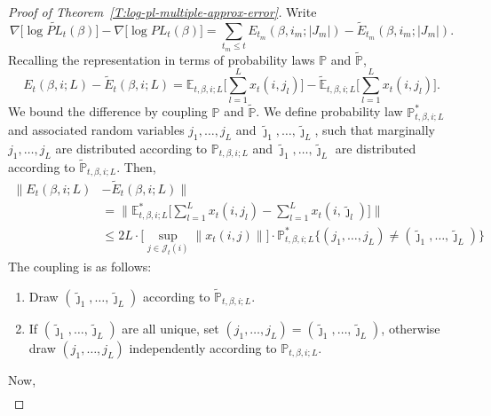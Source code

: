 \documentclass[aoas,preprint]{imsart}
\begin{document}
\begin{proof}[Proof of Theorem~\ref{T:log-pl-multiple-approx-error}]
Write
\[
    \nabla \big[ \log \widetilde{\mathit{PL}}_t(\beta) \big]
    -
    \nabla \big[ \log \mathit{PL}_t(\beta )\big]
        =
        \sum_{t_m \leq t}
            E_{t_m}\!(\beta, i_m; |J_m|)
            -
            \widetilde{E}_{t_m}\!(\beta, i_m; |J_m|).
\]
Recalling the representation in terms of probability laws $\mathbb{P}$ and
$\tilde{\mathbb{P}}$,
\[
    E_{t}(\beta, i; L) - \widetilde{E}_t(\beta, i; L)
        =
        \mathbb{E}_{t,\beta,i;L}
            \Big[ \sum_{l=1}^L x_t(i,j_l) \Big]
        -
        \widetilde{\mathbb{E}}_{t,\beta,i;L}
            \Big[ \sum_{l=1}^L x_t(i,j_l) \Big].
\]
We bound the difference by coupling $\mathbb{P}$ and $\widetilde{\mathbb{P}}$.
We define probability law $\mathbb{P}^\ast_{t,\beta,i;L}$ and associated
random variables $j_1, \ldots, j_L$ and
$\tilde \jmath_1, \ldots, \tilde \jmath_L$, such that marginally
$j_1, \ldots, j_L$ are distributed according to $\mathbb{P}_{t,\beta,i;L}$
and $\tilde \jmath_1, \ldots, \tilde \jmath_L$ are distributed according
to $\tilde{\mathbb{P}}_{t,\beta,i;L}$.  Then,
\begin{align*}
    \Big\| E_{t}(\beta, i; L) &- \widetilde{E}_t(\beta, i; L) \Big\| \\
        &=
            \Big\|
            \mathbb{E}_{t,\beta,i;L}^\ast
            \Big[
                \sum_{l=1}^L x_t(i,j_l)
                -
                \sum_{l=1}^L x_t(i, \tilde \jmath_l)
            \Big] 
            \Big\| \\
        &\leq
            2 L
            \cdot
            \Big[
                \sup_{j \in \mathcal{J}_t(i)}
                \| x_t(i,j) \|
            \Big]
            \cdot
            \mathbb{P}^\ast_{t,\beta,i;L}
            \Big\{
                (j_1, \ldots, j_L)
                    \neq
                    (\tilde \jmath_1, \ldots, \tilde \jmath_L)
            \Big\}
\end{align*}
The coupling is as follows:
\begin{enumerate}
    \item Draw $(\tilde \jmath_1, \ldots, \tilde \jmath_L)$ according to
        $\tilde{\mathbb{P}}_{t,\beta,i;L}$.
    \item If $(\tilde \jmath_1, \ldots, \tilde \jmath_L)$ are all unique,
        set $(j_1, \ldots, j_L) = (\tilde \jmath_1, \ldots, \tilde \jmath_L)$,
        otherwise draw $(j_1, \ldots, j_L)$ independently according to
        $\mathbb{P}_{t,\beta,i;L}$.
\end{enumerate}
Now,
\begin{align*}

\end{align*}
\end{proof}
\end{document}
